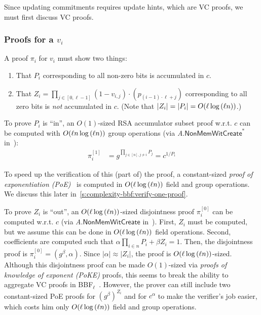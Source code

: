 Since updating commitments requires update hints, which are VC proofs, we must first discuss VC proofs.

\subsubsection{Proofs for a $v_i$}
\label{s:complexity-bbf:compute-one-proof}
A proof $\pi_i$ for $v_i$ must show two things:
\begin{enumerate}
\item That $P_i$ corresponding to all non-zero bits is accumulated in $c$.
\item That $Z_i= \prod_{j\in[0,\ell-1]} {(1-v_{i,j})}\cdot \left(p_{(i-1)\cdot \ell + j}\right)$ corresponding to all zero bits is \textit{not} accumulated in $c$.
(Note that $|Z_i|=|P_i|=O(\ell\log{(\ell n)})$.)
\end{enumerate}

To prove $P_i$ is ``in'', an $O(1)$-sized RSA accumulator subset proof w.r.t. $c$ can be computed with $O(\ell n \log{(\ell n)})$ group operations (via \textit{A}.$\mathsf{NonMemWitCreate}^*$ in~\cite[Sec 4.2, pg. 15]{BBF18}):
\begin{align}
\label{eq:bbf:pi_i1}
\pi_i^{[1]} &=g^{\prod_{j\in [n],j \ne i} P_j} = c^{1/P_i}
\end{align}

To speed up the verification of this (part of) the proof, a constant-sized \textit{proof of exponentiation (PoE)}~\cite{BBF18} is computed in $O(\ell\log{(\ell n)})$ field and group operations.
We discuss this later in~\cref{s:complexity-bbf:verify-one-proof}.

To prove $Z_i$ is ``out'', an $O(\ell \log{(\ell n)})$-sized disjointness proof $\pi_i^{[0]}$ can be computed w.r.t. $c$ (via \textit{A}.$\mathsf{NonMemWitCreate}$ in~\cite[Sec 4.1, pg. 14]{BBF18}).
First, $Z_i$ must be computed, but we assume this can be done in $O(\ell\log{(\ell n)})$ field operations.
Second, \bezout coefficients are computed such that $\alpha \prod_{i\in n} P_i + \beta Z_i =1$.
Then, the disjointness proof is $\pi_i^{[0]}=(g^{\beta},\alpha)$.
Since $|\alpha| \approx |Z_i|$, the proof is $O(\ell \log{(\ell n)})$-sized.
Although this disjointness proof can be made $O(1)$-sized via \textit{proofs of knowledge of exponent (PoKE)} proofs, this seems to break the ability to aggregate VC proofs in BBF$_\ell$~\cite[Sec 5.2, pg. 20]{BBF18}.
However, the prover can still include two constant-sized  PoE proofs for $(g^{\beta})^{Z_i}$ and for $c^{\alpha}$ to make the verifier's job easier, which costs him only $O(\ell \log{(\ell n)})$ field and group operations.

